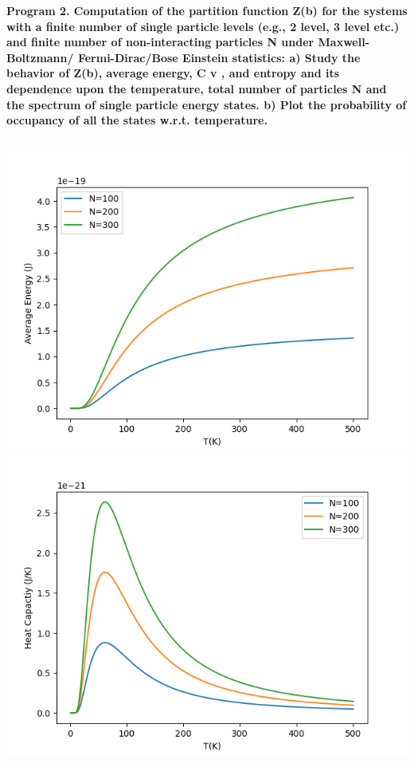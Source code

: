 \documentclass{article}
\begin{document}
	\textbf{Program 2. Computation of the partition function Z(b) for the systems with a finite number of single
		particle levels (e.g., 2 level, 3 level etc.) and finite number of non-interacting particles
		N under Maxwell-Boltzmann/ Fermi-Dirac/Bose Einstein statistics:
		a) Study the behavior of Z(b), average energy, C v , and entropy and its dependence upon the
		temperature, total number of particles N and the spectrum of single particle energy
		states.
		b) Plot the probability of occupancy of all the states w.r.t. temperature.}
	\inputminted{python}{prac_3_MB.py}
	\includegraphics[width=15 cm]{MB_1.png}
	\includegraphics[width=15 cm]{MB_2.png}
\end{document}

